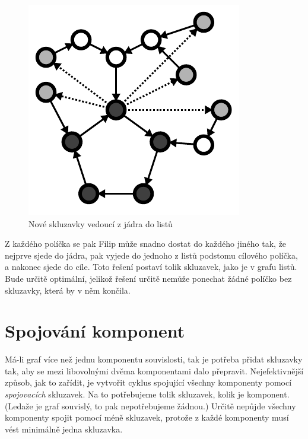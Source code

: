 \documentclass{article}
\begin{document}
\begin{figure}[ht]
    \centering
    \includegraphics{back-edge.pdf}
    \caption{Nové skluzavky vedoucí z jádra do listů}
\end{figure}

Z každého políčka se pak Filip může snadno dostat do každého jiného tak, že nejprve sjede do jádra, pak vyjede do jednoho z listů podstomu cílového políčka, a nakonec sjede do cíle. Toto řešení postaví tolik skluzavek, jako je v grafu listů. Bude určitě optimální, jelikož řešení určitě nemůže ponechat žádné políčko bez skluzavky, která by v něm končila.

\section{Spojování komponent}

Má-li graf více než jednu komponentu souvislosti, tak je potřeba přidat skluzavky tak, aby se mezi libovolnými dvěma komponentami dalo přepravit. Nejefektivnější způsob, jak to zařídit, je vytvořit cyklus spojující všechny komponenty pomocí \textit{spojovacích} skluzavek. Na to potřebujeme tolik skluzavek, kolik je komponent. (Ledaže je graf souvislý, to pak nepotřebujeme žádnou.) Určitě nepůjde všechny komponenty spojit pomocí méně skluzavek, protože z každé komponenty musí vést minimálně jedna skluzavka.
\end{document}
